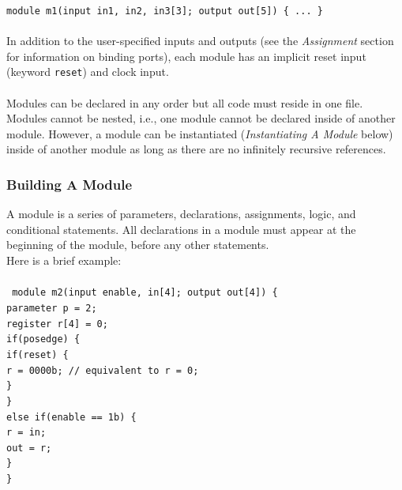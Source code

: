\documentclass[letterpaper,11pt]{article}
\newcommand{\tab}{\hspace*{2em}}
\begin{document}
        \texttt{module m1(input in1, in2, in3[3]; output out[5]) \{ ... \} }\\\\
        In addition to the user-specified inputs and outputs (see the \emph{Assignment} section for
        information on binding ports), each module has an implicit reset input (keyword \texttt{reset})
        and clock input.\\\\
        
        Modules can be declared in any order but all code must reside in one file.  Modules cannot be 
        nested, i.e., one module cannot be declared inside of another module.  However, a module can be 
        instantiated (\emph{Instantiating A Module} below) inside of another module as long as there are 
        no infinitely recursive references.
        
        
        \subsubsection{Building A Module}
        A module is a series of parameters, declarations, assignments, logic, and conditional statements. 
        All declarations in a module must appear at the beginning of the module, before any other statements.\\
        Here is a brief example:\\\\
        \texttt{
        module m2(input enable, in[4]; output out[4]) \{ \\
        \tab parameter p = 2;\\
        \tab register r[4] = 0; \\
        \tab if(posedge) \{ \\
        \tab\tab if(reset) \{ \\
        \tab\tab\tab r = 0000b; // equivalent to r = 0; \\
        \tab\tab \} \\
        \tab \} \\
        \tab else if(enable == 1b) \{ \\
        \tab\tab r = in; \\
        \tab\tab out = r; \\
        \tab\} \\
        \}}
        
\end{document}
